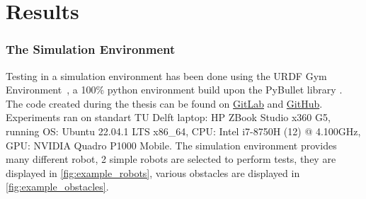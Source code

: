 \chapter{Results}


\subsection{The Simulation Environment} Testing in a simulation environment has been done using the URDF Gym Environment~\cite{spahn_urdfenvironment_2022}, a 100\% python environment build upon the PyBullet library \cite{coumans_pybullet_2016}. The code created during the thesis can be found on \href{https://gitlab.tudelft.nl/airlab-delft/msc_projects/msc_gijs_groote}{GitLab} and \href{https://github.com/GijsGroote/semantic-thinking-robot}{GitHub}. Experiments ran on standart TU Delft laptop: HP ZBook Studio x360 G5, running OS: Ubuntu 22.04.1 LTS x86\_64, CPU: Intel i7-8750H (12) @ 4.100GHz, GPU: NVIDIA Quadro P1000 Mobile.\bs
The simulation environment provides many different robot, 2 simple robots are selected to perform tests, they are displayed in \cref{fig:example_robots}, various obstacles are displayed in \cref{fig:example_obstacles}.

